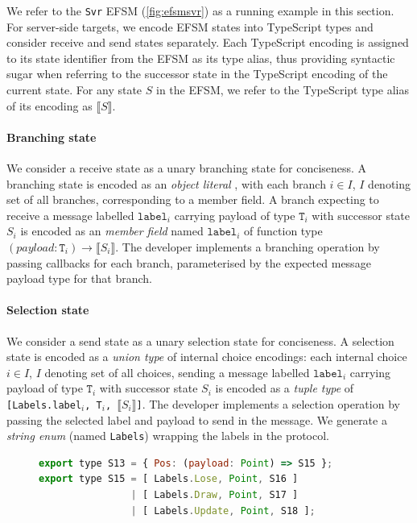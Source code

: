 We refer to the \texttt{Svr} EFSM (\cref{fig:efsmsvr}) as a running example in
this section.
For server-side targets, we encode EFSM states into TypeScript types and
consider receive and send states separately.
Each TypeScript encoding is assigned to its state identifier from the EFSM as
its type alias, thus providing syntactic sugar when referring to the successor
state in the TypeScript encoding of the current state.
For any state $S$ in the EFSM, we refer to the TypeScript type alias of its
encoding as $\llbracket S \rrbracket$.

\paragraph{Branching state}
We consider a receive state as a unary branching state for conciseness.
A branching state is encoded as an \textit{object literal}
\cite{TypeScriptSpec}, with each branch $i \in I$, $I$ denoting set of all
branches, corresponding to a member field.
A branch expecting to receive a message labelled $\texttt{label}_i$ carrying
payload of type $\texttt{T}_i$ with successor state $S_i$ is encoded as an
\textit{member field} named $\texttt{label}_i$ of function type
$(payload:\texttt{T}_i) \to \llbracket S_i \rrbracket$.
The developer implements a branching operation by passing callbacks for each
branch, parameterised by the expected message payload type for that branch.

\paragraph{Selection state}
We consider a send state as a unary selection state for conciseness.
A selection state is encoded as a \textit{union type}
\cite{TypeScriptSpec} of internal choice encodings: each internal choice $i \in
I$, $I$ denoting set of all choices, sending a message labelled
$\texttt{label}_i$ carrying payload of type $\texttt{T}_i$ with successor state
$S_i$ is encoded as a \textit{tuple type} of \texttt{[Labels.label$_i$, T$_i$,
  $\llbracket S_i \rrbracket$]}.
The developer implements a selection operation by passing the selected label
and payload to send in the message.
We generate a \textit{string enum} (named \texttt{Labels}) wrapping the labels
in the protocol.

\begin{figure}[ht]
\begin{lstlisting}[language=JavaScript]
export type S13 = { Pos: (payload: Point) => S15 };
export type S15 = [ Labels.Lose, Point, S16 ]
                | [ Labels.Draw, Point, S17 ]
                | [ Labels.Update, Point, S18 ];
\end{lstlisting}
\label{lst:svr}
\end{figure}

